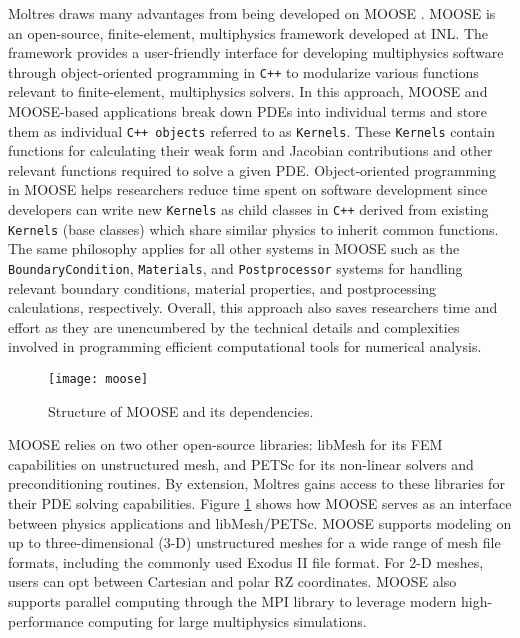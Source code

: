 Moltres draws many advantages from being developed on MOOSE
\cite{permann_moose_2020}. MOOSE is an open-source, finite-element,
multiphysics framework developed at \gls{INL}. The framework provides a
user-friendly interface for developing multiphysics software through
object-oriented programming in \texttt{C++} to modularize various
functions relevant to finite-element, multiphysics solvers. In this approach,
MOOSE and MOOSE-based applications break down \glspl{PDE} into individual terms
and store them
as individual \texttt{C++ objects} referred to as \texttt{Kernels}. These
\texttt{Kernels} contain functions for calculating their weak form and Jacobian
contributions and other relevant functions required to solve a given
\gls{PDE}. Object-oriented programming in MOOSE helps researchers
reduce time spent on software development since developers can write new
\texttt{Kernels} as child classes in \texttt{C++} derived from existing
\texttt{Kernels} (base classes) which share similar physics to inherit common
functions. The same philosophy applies for all other systems in MOOSE such as
the \texttt{BoundaryCondition}, \texttt{Materials}, and \texttt{Postprocessor}
systems for handling relevant boundary conditions, material properties, and
postprocessing calculations, respectively. Overall, this approach also saves
researchers time and effort as they are unencumbered by the technical details
and complexities involved in programming efficient computational tools for
numerical analysis.

\begin{figure}[htb!]
	\centering
	\texttt{[image: moose]}
	\caption{Structure of MOOSE and its dependencies.}
	\label{fig:moose}
\end{figure}

MOOSE relies on two other open-source libraries: libMesh
\cite{kirk_libmesh_2006} for its \gls{FEM} capabilities on
unstructured mesh, and PETSc \cite{satish_petsc_2019} for its non-linear
solvers and preconditioning routines. By extension, Moltres gains access to
these libraries for their \gls{PDE} solving capabilities. Figure
\ref{fig:moose} shows how MOOSE serves as an interface between physics
applications and libMesh/PETSc. MOOSE supports
modeling on up to three-dimensional (3-D) unstructured meshes for a wide range
of mesh file formats, including the commonly used Exodus II file format. For
2-D meshes, users can opt between Cartesian and polar RZ coordinates. MOOSE
also supports parallel computing through the \gls{MPI} library to leverage
modern high-performance computing for large multiphysics simulations.

